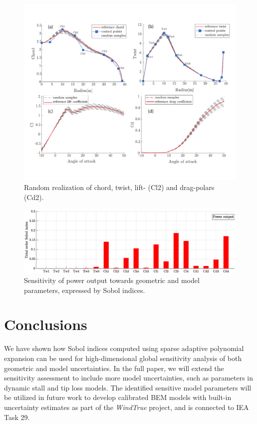 \documentclass[11pt]{article}
\begin{document}
\begin{figure}[h!]
 \centering
 \includegraphics[trim={0 1.6cm 0 1.5cm},clip, scale=0.67]{figure1.pdf}
 \caption{Random realization of chord, twist, lift- (Cl2) and drag-polars (Cd2).}
 \label{fig:samples}
\end{figure}

\begin{figure}[h!]
 \centering
  \includegraphics[width=\linewidth]{SA_Power_chord_twist_Cl_Cd.eps}
 \caption{Sensitivity of power output towards geometric and model parameters, expressed by Sobol indices.}
  \label{fig:Sobol}
\end{figure}
\section{Conclusions}
We have shown how Sobol indices computed using sparse adaptive polynomial expansion can be used for high-dimensional global sensitivity analysis of both geometric and model uncertainties. In the full paper, we will extend the sensitivity assessment to include more model uncertainties, such as parameters in dynamic stall and tip loss models. The identified sensitive model parameters will be utilized in future work to develop calibrated BEM models with built-in uncertainty estimates as part of the \textit{WindTrue} project, and is connected to IEA Task 29.



\end{document}
